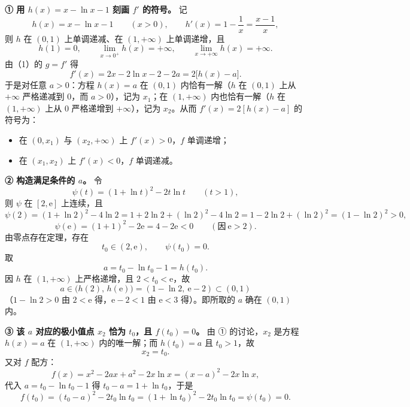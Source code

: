 \begin{answer}
\textbf{① 用 \(h(x)=x-\ln x-1\) 刻画 \(f'\) 的符号。} 记
\nopagebreak[4]
\[
h(x)=x-\ln x-1\qquad(x>0),\qquad h'(x)=1-\frac{1}{x}=\frac{x-1}{x},
\]
则 \(h\) 在 \((0,1)\) 上单调递减、在 \((1,+\infty)\) 上单调递增，且
\nopagebreak[4]
\[
h(1)=0,\qquad \lim_{x\to0^{+}}h(x)=+\infty,\qquad \lim_{x\to+\infty}h(x)=+\infty .
\]
由（1）的 \(g=f'\) 得
\nopagebreak[4]
\[
f'(x)=2x-2\ln x-2-2a=2\bigl[h(x)-a\bigr].
\]
于是对任意 \(a>0\)：方程 \(h(x)=a\) 在 \((0,1)\) 内恰有一解（\(h\) 在 \((0,1)\) 上从 \(+\infty\) 严格递减到 \(0\)，而 \(a>0\)），记为 \(x_{1}\)；在 \((1,+\infty)\) 内也恰有一解（\(h\) 在 \((1,+\infty)\) 上从 \(0\) 严格递增到 \(+\infty\)），记为 \(x_{2}\)。从而 \(f'(x)=2[h(x)-a]\) 的符号为：

\begin{itemize}
\item 在 \((0,x_{1})\) 与 \((x_{2},+\infty)\) 上 \(f'(x)>0\)，\(f\) 单调递增；
\item 在 \((x_{1},x_{2})\) 上 \(f'(x)<0\)，\(f\) 单调递减。
\end{itemize}

\textbf{② 构造满足条件的 \(a\)。} 令
\nopagebreak[4]
\[
\psi(t)=(1+\ln t)^{2}-2t\ln t\qquad(t>1),
\]
则 \(\psi\) 在 \([2,\mathrm{e}]\) 上连续，且
\nopagebreak[4]
\[
\psi(2)=(1+\ln 2)^{2}-4\ln 2=1+2\ln 2+(\ln 2)^{2}-4\ln 2=1-2\ln 2+(\ln 2)^{2}=(1-\ln 2)^{2}>0,
\]
\nopagebreak[4]
\[
\psi(\mathrm{e})=(1+1)^{2}-2\mathrm{e}=4-2\mathrm{e}<0\qquad(\text{因}\ \mathrm{e}>2).
\]
由零点存在定理，存在
\nopagebreak[4]
\[
t_{0}\in(2,\mathrm{e}),\qquad \psi(t_{0})=0 .
\]
取
\nopagebreak[4]
\[
a=t_{0}-\ln t_{0}-1=h(t_{0}).
\]
因 \(h\) 在 \((1,+\infty)\) 上严格递增，且 \(2<t_{0}<\mathrm{e}\)，故
\nopagebreak[4]
\[
a\in\bigl(h(2),\,h(\mathrm{e})\bigr)=(1-\ln 2,\ \mathrm{e}-2)\subset(0,1)
\]
（\(1-\ln 2>0\) 由 \(2<\mathrm{e}\) 得，\(\mathrm{e}-2<1\) 由 \(\mathrm{e}<3\) 得）。即所取的 \(a\) 确在 \((0,1)\) 内。

\textbf{③ 该 \(a\) 对应的极小值点 \(x_{2}\) 恰为 \(t_{0}\)，且 \(f(t_{0})=0\)。} 由 ① 的讨论，\(x_{2}\) 是方程 \(h(x)=a\) 在 \((1,+\infty)\) 内的唯一解；而 \(h(t_{0})=a\) 且 \(t_{0}>1\)，故
\nopagebreak[4]
\[
x_{2}=t_{0}.
\]
又对 \(f\) 配方：
\nopagebreak[4]
\[
f(x)=x^{2}-2ax+a^{2}-2x\ln x=(x-a)^{2}-2x\ln x,
\]
代入 \(a=t_{0}-\ln t_{0}-1\) 得 \(t_{0}-a=1+\ln t_{0}\)，于是
\nopagebreak[4]
\[
f(t_{0})=(t_{0}-a)^{2}-2t_{0}\ln t_{0}=(1+\ln t_{0})^{2}-2t_{0}\ln t_{0}=\psi(t_{0})=0 .
\]


\end{answer}
